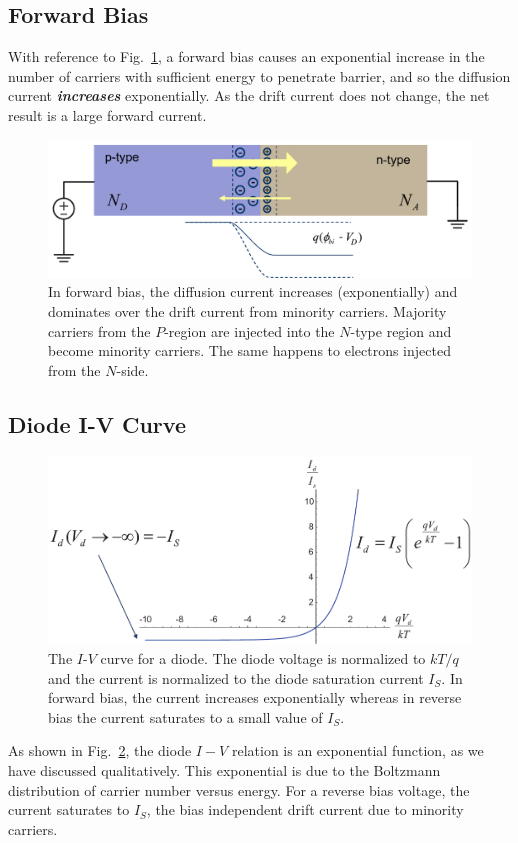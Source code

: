 \subsection{Forward Bias}
With reference to Fig.~\ref{fig:slide36b}, a forward bias causes an exponential increase in the number of carriers with sufficient energy to penetrate barrier, and so the diffusion current \textbf{\textit{increases}} exponentially.  As the drift current does not change, the net result is a large forward current.
\begin{figure}[tb]
\centering
\includegraphics[width=.75\columnwidth]{slide36b}
\caption{In forward bias, the diffusion current increases (exponentially) and dominates over the drift current from minority carriers.  Majority carriers from the $P$-region are injected into the $N$-type region and become minority carriers. The same happens to electrons injected from the $N$-side.}
\label{fig:slide36b}
\end{figure}
\subsection{Diode I-V Curve}
\begin{figure}[tb]
\centering
\includegraphics[width=.75\columnwidth]{slide38}
\caption{The $I$-$V$ curve for a diode.  The diode voltage is normalized to $kT/q$ and the current is normalized to the diode saturation current $I_S$.   In forward bias, the current increases exponentially whereas in reverse bias the current saturates to a small value of $I_S$.}
\label{fig:slide38}
\end{figure}
As shown in Fig.~\ref{fig:slide38}, the diode $I-V$ relation is an exponential function, as we have discussed qualitatively.    This exponential is due to the Boltzmann distribution of carrier number versus energy.    For a reverse bias voltage,  the current saturates to $I_S$, the bias independent drift current due to minority carriers.

